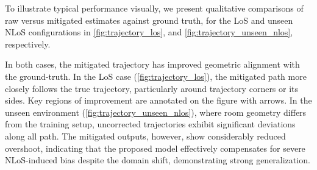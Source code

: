 To illustrate typical performance visually, we present qualitative comparisons of raw versus mitigated estimates against ground truth, for the LoS and unseen NLoS configurations in \autoref{fig:trajectory_los}, and \autoref{fig:trajectory_unseen_nlos}, respectively. 

In both cases, the mitigated trajectory has improved geometric alignment with the ground-truth. In the LoS case (\autoref{fig:trajectory_los}), the mitigated path more closely follows the true trajectory, particularly around trajectory corners or its sides. Key regions of improvement are annotated on the figure with arrows. In the unseen environment (\autoref{fig:trajectory_unseen_nlos}), where room geometry differs from the training setup, uncorrected trajectories exhibit significant deviations along all path. The mitigated outputs, however, show considerably reduced overshoot, indicating that the proposed model effectively compensates for severe NLoS-induced bias despite the domain shift, demonstrating strong generalization.